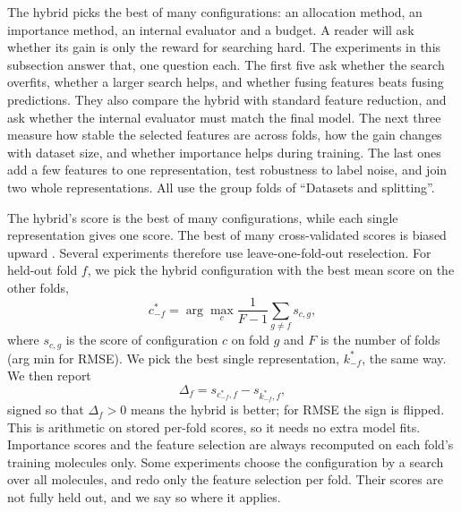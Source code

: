 The hybrid picks the best of many configurations: an allocation method, an importance method, an internal evaluator and a budget. A reader will ask whether its gain is only the reward for searching hard. The experiments in this subsection answer that, one question each. The first five ask whether the search overfits, whether a larger search helps, and whether fusing features beats fusing predictions. They also compare the hybrid with standard feature reduction, and ask whether the internal evaluator must match the final model. The next three measure how stable the selected features are across folds, how the gain changes with dataset size, and whether importance helps during training. The last ones add a few features to one representation, test robustness to label noise, and join two whole representations. All use the group folds of ``Datasets and splitting''.

The hybrid's score is the best of many configurations, while each single representation gives one score. The best of many cross-validated scores is biased upward \citep{Varma2006}. Several experiments therefore use leave-one-fold-out reselection. For held-out fold $f$, we pick the hybrid configuration with the best mean score on the other folds,
\[
c^*_{-f} = \arg\max_c \frac{1}{F-1}\sum_{g\neq f} s_{c,g},
\]
where $s_{c,g}$ is the score of configuration $c$ on fold $g$ and $F$ is the number of folds (arg min for RMSE). We pick the best single representation, $k^*_{-f}$, the same way. We then report
\[
\Delta_f = s_{c^*_{-f},f} - s_{k^*_{-f},f},
\]
signed so that $\Delta_f>0$ means the hybrid is better; for RMSE the sign is flipped. This is arithmetic on stored per-fold scores, so it needs no extra model fits. Importance scores and the feature selection are always recomputed on each fold's training molecules only. Some experiments choose the configuration by a search over all molecules, and redo only the feature selection per fold. Their scores are not fully held out, and we say so where it applies.

